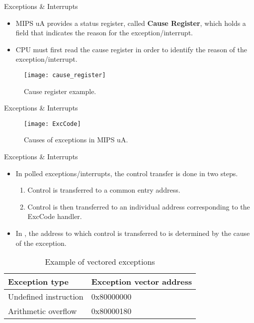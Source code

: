 % 
\begin{frame}{Exceptions \& Interrupts}{}
\begin{itemize}
\item \ac{MIPS} \ac{uA} provides a status register, called \textbf{Cause Register}, which holds a field that indicates the reason for the exception/interrupt.
\item \ac{CPU} must first read the cause register in order to identify the reason of the exception/interrupt.
\end{itemize}
\begin{figure}
\centering
\texttt{[image: cause\_register]}
\caption{Cause register example.}
\label{Figure:CauseRegister}
\end{figure}
\end{frame}

% 
\begin{frame}{Exceptions \& Interrupts}{}
\begin{figure}
\centering
\texttt{[image: ExcCode]}
\vspace{-10pt}
\caption{Causes of exceptions in \ac{MIPS} \ac{uA}.}
\label{Figure:ExcCode}
\end{figure}
\end{frame}

% 
\begin{frame}{Exceptions \& Interrupts}{}
\begin{itemize}
\item In polled exceptions/interrupts, the control transfer is done in two steps.
  \begin{enumerate}
  \item Control is transferred to a common entry address.
  \item Control is then transferred to an individual address corresponding to the ExcCode handler.
  \end{enumerate}
\item In , the address to which control is transferred to is determined by the cause of the exception.
\end{itemize}
\begin{table}
\caption{Example of vectored exceptions}
\label{Table:vectored_interrupt_examples}
\begin{tabular}{l|l}
\hline\hline
Exception type        & Exception vector address \\\hline
Undefined instruction & 0x80000000 \\\hline
Arithmetic overflow   & 0x80000180 \\\hline\hline
\end{tabular}
\end{table}
\end{frame}

